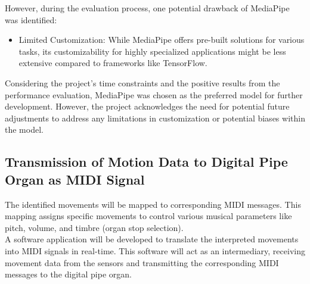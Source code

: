 \documentclass[]{article}
\begin{document}
\noindent However, during the evaluation process, one potential drawback of MediaPipe was identified:

\begin{itemize}
\item Limited Customization: While MediaPipe offers pre-built solutions for various tasks, its customizability for highly specialized applications might be less extensive compared to frameworks like TensorFlow.
\end{itemize}

\noindent Considering the project's time constraints and the positive results from the performance evaluation, MediaPipe was chosen as the preferred model for further development. However, the project acknowledges the need for potential future adjustments to address any limitations in customization or potential biases within the model.

\subsection{Transmission of Motion Data to Digital Pipe Organ as MIDI Signal}

The identified movements will be mapped to corresponding MIDI messages. This mapping assigns specific movements to control various musical parameters like pitch, volume, and timbre (organ stop selection). \\
A software application will be developed to translate the interpreted movements into MIDI signals in real-time. This software will act as an intermediary, receiving movement data from the sensors and transmitting the corresponding MIDI messages to the digital pipe organ.
\end{document}
